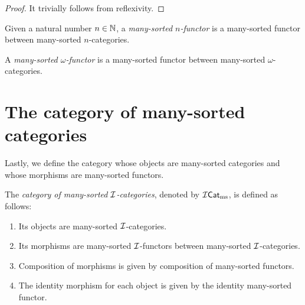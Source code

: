 \begin{proof}
  \leanok
  It trivially follows from reflexivity.
\end{proof}

\begin{definition}
  \label{def:ManySortedNFunctor}
  \leanok
  Given a natural number $n \in \mathbb{N}$, a \emph{many-sorted $n$-functor} is a many-sorted functor
  between many-sorted $n$-categories.
\end{definition}

\begin{definition}
  \label{def:ManySortedOmegaFunctor}
  \leanok
  A \emph{many-sorted $\omega$-functor} is a many-sorted functor between many-sorted
  $\omega$-categories.
\end{definition}

\section{The category of many-sorted categories}

Lastly, we define the category whose objects are many-sorted categories and whose morphisms are
many-sorted functors.

\begin{construction}
  \label{def:ManySortedCategory_category}
  \leanok
  The \emph{category of many-sorted $\mathcal{I}$-categories}, denoted by $\mathcal{I}\mathsf{Cat}_{\mathrm{ms}}$, is defined as
  follows:

  \begin{enumerate}
    \item \label{ax:ms_cat_obj} Its objects are many-sorted $\mathcal{I}$-categories.
    \item \label{ax:ms_cat_mor} Its morphisms are many-sorted $\mathcal{I}$-functors between many-sorted
      $\mathcal{I}$-categories.
    \item \label{ax:ms_cat_comp} Composition of morphisms is given by composition of many-sorted
      functors.
    \item \label{ax:ms_cat_id} The identity morphism for each object is given by the identity
      many-sorted functor.
  \end{enumerate}
\end{construction}

